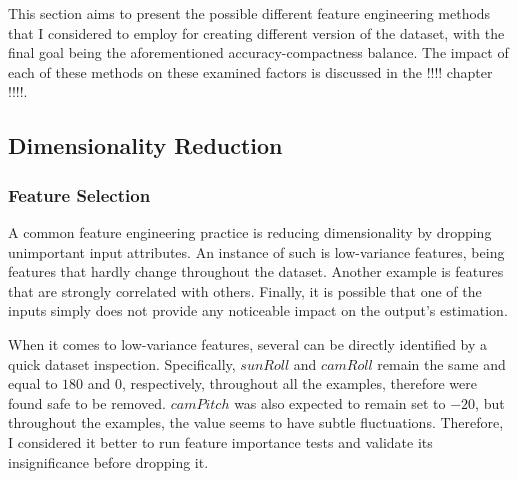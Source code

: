 This section aims to present the possible different feature engineering methods that I considered to employ for creating different version of the dataset, with the final goal being the aforementioned accuracy-compactness balance. The impact of each of these methods on these examined factors is discussed in the !!!! chapter !!!!.


\subsection{Dimensionality Reduction}



\subsubsection{Feature Selection}
\label{feature-sel}

A common feature engineering practice is reducing dimensionality by dropping unimportant input attributes. An instance of such is low-variance features, being features that hardly change throughout the dataset. Another example is features that are strongly correlated with others. Finally, it is possible that one of the inputs simply does not provide any noticeable impact on the output's estimation.

When it comes to low-variance features, several can be directly identified by a quick dataset inspection. Specifically, $sunRoll$ and $camRoll$ remain the same and equal to $180$ and $0$, respectively, throughout all the examples, therefore were found safe to be removed. $camPitch$ was also expected to remain set to $-20$, but throughout the examples, the value seems to have subtle fluctuations. Therefore, I considered it better to run feature importance tests and validate its insignificance before dropping it.

